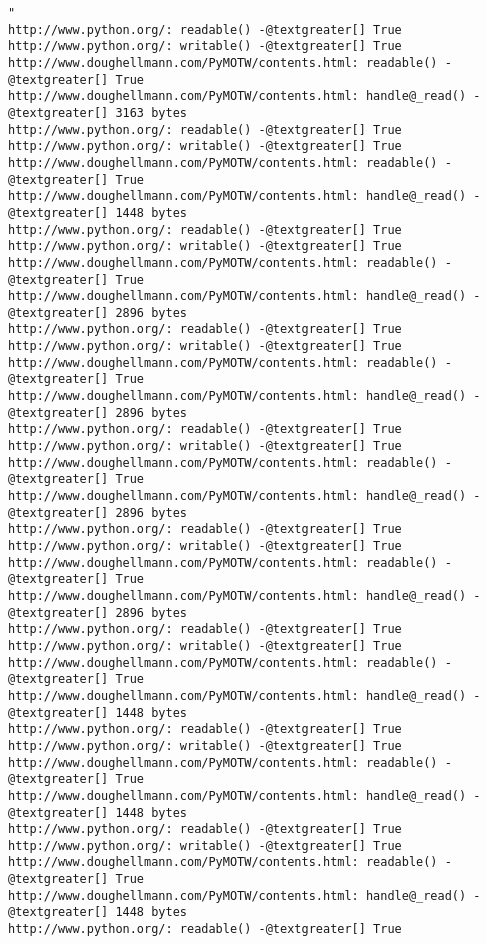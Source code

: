 \documentclass[a4paper,10pt,english]{manual}
\begin{document}
\begin{Verbatim}[commandchars=@\[\]]
"
http://www.python.org/: readable() -@textgreater[] True
http://www.python.org/: writable() -@textgreater[] True
http://www.doughellmann.com/PyMOTW/contents.html: readable() -@textgreater[] True
http://www.doughellmann.com/PyMOTW/contents.html: handle@_read() -@textgreater[] 3163 bytes
http://www.python.org/: readable() -@textgreater[] True
http://www.python.org/: writable() -@textgreater[] True
http://www.doughellmann.com/PyMOTW/contents.html: readable() -@textgreater[] True
http://www.doughellmann.com/PyMOTW/contents.html: handle@_read() -@textgreater[] 1448 bytes
http://www.python.org/: readable() -@textgreater[] True
http://www.python.org/: writable() -@textgreater[] True
http://www.doughellmann.com/PyMOTW/contents.html: readable() -@textgreater[] True
http://www.doughellmann.com/PyMOTW/contents.html: handle@_read() -@textgreater[] 2896 bytes
http://www.python.org/: readable() -@textgreater[] True
http://www.python.org/: writable() -@textgreater[] True
http://www.doughellmann.com/PyMOTW/contents.html: readable() -@textgreater[] True
http://www.doughellmann.com/PyMOTW/contents.html: handle@_read() -@textgreater[] 2896 bytes
http://www.python.org/: readable() -@textgreater[] True
http://www.python.org/: writable() -@textgreater[] True
http://www.doughellmann.com/PyMOTW/contents.html: readable() -@textgreater[] True
http://www.doughellmann.com/PyMOTW/contents.html: handle@_read() -@textgreater[] 2896 bytes
http://www.python.org/: readable() -@textgreater[] True
http://www.python.org/: writable() -@textgreater[] True
http://www.doughellmann.com/PyMOTW/contents.html: readable() -@textgreater[] True
http://www.doughellmann.com/PyMOTW/contents.html: handle@_read() -@textgreater[] 2896 bytes
http://www.python.org/: readable() -@textgreater[] True
http://www.python.org/: writable() -@textgreater[] True
http://www.doughellmann.com/PyMOTW/contents.html: readable() -@textgreater[] True
http://www.doughellmann.com/PyMOTW/contents.html: handle@_read() -@textgreater[] 1448 bytes
http://www.python.org/: readable() -@textgreater[] True
http://www.python.org/: writable() -@textgreater[] True
http://www.doughellmann.com/PyMOTW/contents.html: readable() -@textgreater[] True
http://www.doughellmann.com/PyMOTW/contents.html: handle@_read() -@textgreater[] 1448 bytes
http://www.python.org/: readable() -@textgreater[] True
http://www.python.org/: writable() -@textgreater[] True
http://www.doughellmann.com/PyMOTW/contents.html: readable() -@textgreater[] True
http://www.doughellmann.com/PyMOTW/contents.html: handle@_read() -@textgreater[] 1448 bytes
http://www.python.org/: readable() -@textgreater[] True

\end{Verbatim}
\end{document}
